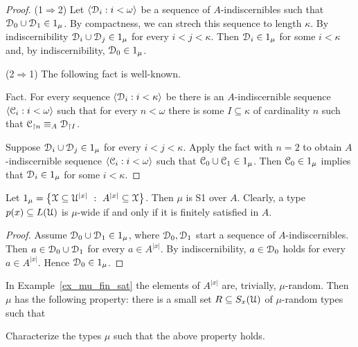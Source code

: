 \documentclass{amsproc}
\begin{document}
\begin{proof}
  (1$\Rightarrow$2)  Let $\langle\EuScript D_i:i<\omega\rangle$ be a sequence of $A$-indiscernibles such that $\EuScript D_0\cup\EuScript D_1\in1_\mu$.
  By compactness, we can strech this sequence to length $\kappa$.
  By indiscernibility $\EuScript D_i\cup\EuScript D_j\in1_\mu$ for every $i<j<\kappa$.
  Then $\EuScript D_i\in1_\mu$ for some $i<\kappa$ and, by indiscernibility,  $\EuScript D_0\in1_\mu$.

  (2$\Rightarrow$1)
  The following fact is well-known.
  
  Fact.
  For every sequence $\langle\EuScript D_i:i<\kappa\rangle$ be there is an $A$-indiscernible sequence $\langle\EuScript C_i:i<\omega\rangle$ such that for every $n<\omega$ there is some $I\subseteq\kappa$ of cardinality $n$ such that $\EuScript C_{\restriction n}\equiv_A\EuScript D_{\restriction I}$.

  Suppose $\EuScript D_i\cup \EuScript D_j\in1_\mu$ for every $i<j<\kappa$.
  Apply the fact with $n=2$ to obtain $A$-indiscer\-nible sequence $\langle\EuScript C_i:i<\omega\rangle$ such that $\EuScript C_0\cup \EuScript C_1\in1_\mu$.
  Then $\EuScript C_0\in1_\mu$ implies that $\EuScript D_i\in1_\mu$ for some $i<\kappa$.
\end{proof}

\begin{example}\label{ex_mu_fin_sat}
  Let $1_\mu=\big\{\EuScript X\subseteq\EuScript U^{|x|}\ :\ A^{|x|}\subseteq\EuScript X\big\}$.
  Then $\mu$ is S1 over $A$.
  Clearly, a type $p(x)\subseteq L(\EuScript U)$ is $\mu$-wide if and only if it is finitely satisfied in $A$.
\end{example}

\begin{proof} 
  Assume $\EuScript D_0\cup\EuScript D_1\in1_\mu$, where $\EuScript D_0,\EuScript D_1$ start a sequence of $A$-indiscernibles.
  Then $a\in\EuScript D_0\cup\EuScript D_1$ for every $a\in A^{|x|}$.
  By indiscernibility, $a\in\EuScript D_0$ holds for every $a\in A^{|x|}$.
  Hence $\EuScript D_0\in1_\mu$.
\end{proof}

\begin{exercise}
  In Example~\ref{ex_mu_fin_sat} the elements of $A^{|x|}$ are, trivially, $\mu$-random.
  Then $\mu$ has the following property: there is a small set $R\subseteq S_x(\EuScript U)$ of $\mu$-random types such that 
  
  
  Characterize the types $\mu$ such that the above property holds.
\end{exercise}
\end{document}
